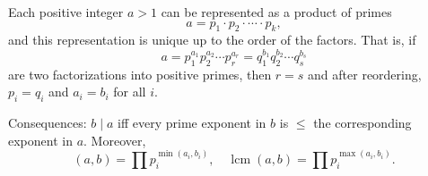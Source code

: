 Each positive integer $a > 1$ can be represented as a product of primes
$$a = p_1 \cdot p_2 \cdot \cdots \cdot p_k,$$
and this representation is unique up to the order of the factors. That is, if
$$a = p_1^{a_1} p_2^{a_2} \cdots p_r^{a_r} = q_1^{b_1} q_2^{b_2} \cdots q_s^{b_s}$$
are two factorizations into positive primes, then $r = s$ and after reordering, $p_i = q_i$ and $a_i = b_i$ for all $i$.

Consequences: $b \mid a$ iff every prime exponent in $b$ is $\leq$ the corresponding exponent in $a$. Moreover,
$$(a, b) = \prod p_i^{\min(a_i, b_i)}, \quad \operatorname{lcm}(a, b) = \prod p_i^{\max(a_i, b_i)}.$$

